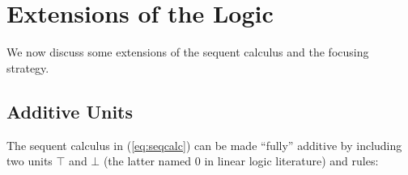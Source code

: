 \documentclass[submission,copyright,creativecommons]{eptcs}
\theoremstyle{definition}
\newcommand\cheng[1]{\mbox{}
{\marginpar{\color{blue}CSW}}
{\sf\noindent\color{blue}#1}}%
\begin{document}
\section{Extensions of the Logic}\label{sec:extensions}
We now discuss some extensions of the sequent calculus and the focusing strategy.

\subsection{Additive Units}\label{subsec:AddUnits}

The sequent calculus in (\ref{eq:seqcalc}) can be made ``fully'' additive by including two units $\top$ and $\bot$ (the latter named 0 in linear logic literature) %
and rules:
\end{document}
